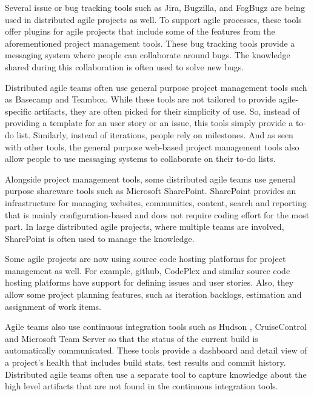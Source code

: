 Several issue or bug tracking tools such as Jira\cite{jira}, Bugzilla\cite{bugzilla}, and FogBugz\cite{fog_bugz} are being used in distributed agile projects as well. To support agile processes, these tools offer plugins for agile projects that include some of the features from the aforementioned project management tools. These bug tracking tools provide a messaging system where people can collaborate around bugs. The knowledge shared during this collaboration is often used to solve new bugs\cite{issue_tracking}.

Distributed agile teams often use general purpose project management tools such as Basecamp\cite{basecamp} and Teambox\cite{team_box}. While these tools are not tailored to provide agile-specific artifacts, they are often picked for their simplicity of use. So, instead of providing a template for an user story or an issue, this tools simply provide a to-do list. Similarly, instead of iterations, people rely on milestones. And as seen with other tools, the general purpose web-based project management tools also allow people to use messaging systems to collaborate on their to-do lists.

Alongside project management tools, some distributed agile teams use general purpose shareware tools such as Microsoft SharePoint\cite{share_point}. SharePoint provides an infrastructure for managing websites, communities, content, search and reporting that is mainly configuration-based and does not require coding effort for the most part. In large distributed agile projects, where multiple teams are involved, SharePoint is often used to manage the knowledge.

Some agile projects are now using source code hosting platforms for project management as well. For example, github\cite{github}, CodePlex\cite{codeplex} and similar source code hosting platforms have support for defining issues and user stories. Also, they allow some project planning features, such as iteration backlogs, estimation and assignment of work items.

Agile teams also use continuous integration tools such as Hudson \cite{Hudson}, CruiseControl\cite{cruise_control} and Microsoft Team Server\cite{team_server} so that the status of the current build is automatically communicated. These tools provide a dashboard and detail view of a project's health that includes build stats, test results and commit history. Distributed agile teams often use a separate tool to capture knowledge about the high level artifacts that are not found in the continuous integration tools.

